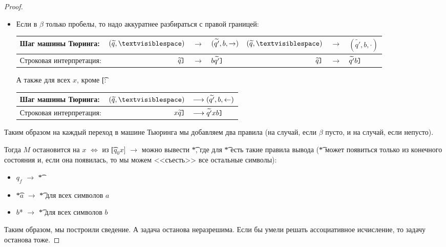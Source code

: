 \begin{proof}
\begin{itemize}
	\item
		Если в $\beta$ только пробелы, то надо аккуратнее разбираться с правой границей:

		\begin{tabular}{|l|rcl|rcl|}
		\hline
			Шаг машины Тюринга: &
			$(\widetilde{q}, \textvisiblespace)$ & $\longrightarrow$ & $(\widetilde{q'}, b, \rightarrow)$ &
			$(\widetilde{q}, \textvisiblespace)$ & $\longrightarrow$ & $(\widetilde{q'}, b, \cdot)$
		\\\hline
			Строковая интерпретация: &
			$\widetilde{q}\texttt{]}$ & $\longrightarrow$ & $b\widetilde{q'}\texttt{]}$ &
			$\widetilde{q}\texttt{]}$ & $\longrightarrow$ & $\widetilde{q'}b\texttt{]}$
		\\\hline
		\end{tabular}

		А также для всех $x$, кроме \t{[}:

		\begin{tabular}{|l|rl|}
		\hline
			Шаг машины Тюринга: &
			$(\widetilde{q}, \textvisiblespace)$ & $\longrightarrow (\widetilde{q'}, b, \leftarrow)$
		\\\hline
			Строковая интерпретация: &
			$x\widetilde{q}\texttt{]}$ & $\longrightarrow \widetilde{q'}xb\texttt{]}$
		\\\hline
		\end{tabular}
	\end{itemize}
	Таким образом на каждый переход в машине Тьюринга мы добавляем два правила (на случай, если $\beta$ пусто, и на случай, если непусто).

	Тогда $M$ остановится на $x$ $\iff$ из \t{[$q_0$$x$]} $\rightarrow$ можно вывести \t{*}, где для \t{*} есть такие правила вывода
	(\t{*} может появиться только из конечного состояния и, если она появилась, то мы можем <<съесть>> все остальные символы):

	\begin{itemize}
	\item $q_f$ $\rightarrow$ \t{*}
	\item \t{*$a$} $\rightarrow$ \t{*} для всех символов $a$
	\item \t{$b$*} $\rightarrow$ \t{*} для всех символов $b$
	\end{itemize}

   Таким образом, мы построили сведение.
   А задача останова неразрешима.
   Если бы умели решать ассоциативное исчисление, то задачу останова тоже.
\end{proof}

